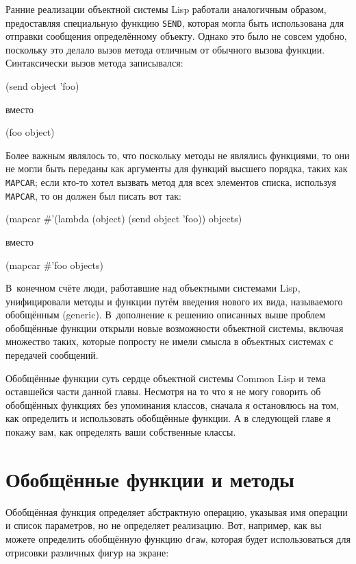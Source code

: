 Ранние реализации объектной системы Lisp работали аналогичным образом, предоставляя
специальную функцию \lstinline{SEND}, которая могла быть использована для отправки сообщения
определённому объекту.  Однако это было не совсем удобно, поскольку это делало вызов
метода отличным от обычного вызова функции.  Синтаксически вызов метода записывался:

\begin{myverb}
(send object 'foo)
\end{myverb}

\noindent{}вместо

\begin{myverb}
(foo object)
\end{myverb}

Более важным являлось то, что поскольку методы не являлись функциями, то они не могли быть
переданы как аргументы для функций высшего порядка, таких как \lstinline{MAPCAR}; если кто-то
хотел вызвать метод для всех элементов списка, используя \lstinline{MAPCAR}, то он должен был
писать вот так:

\begin{myverb}
(mapcar #'(lambda (object) (send object 'foo)) objects)
\end{myverb}

\noindent{}вместо

\begin{myverb}
(mapcar #'foo objects)
\end{myverb}

В~конечном счёте люди, работавшие над объектными системами Lisp, унифицировали методы и
функции путём введения нового их вида, называемого обобщённым (generic).  В~дополнение к
решению описанных выше проблем обобщённые функции открыли новые возможности объектной
системы, включая множество таких, которые попросту не имели смысла в объектных системах с
передачей сообщений.

Обобщённые функции суть сердце объектной системы Common Lisp и тема оставшейся части
данной главы.  Несмотря на то что я не могу говорить об обобщённых функциях без
упоминания классов, сначала я остановлюсь на том, как определить и использовать обобщённые
функции.  А в следующей главе я покажу вам, как определять ваши собственные классы.

\section{Обобщённые функции и методы}

Обобщённая функция определяет абстрактную операцию, указывая имя операции и список
параметров, но не определяет реализацию.  Вот, например, как вы можете определить
обобщённую функцию \lstinline{draw}, которая будет использоваться для отрисовки различных фигур
на экране:

